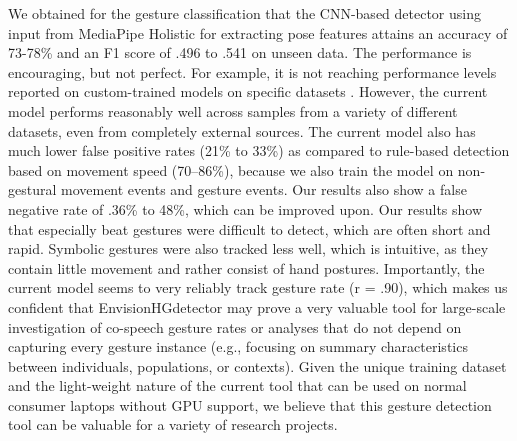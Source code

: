 \documentclass[11pt,smallheadings,cleardoublepage=empty,tocflat,numbers=noenddot,twoside,captions=tableheading]{scrbook}
\begin{document}
\begin{refsection}
We obtained for the gesture classification that the CNN-based detector using input from MediaPipe Holistic for extracting pose features attains an accuracy of 73-78\% and an F1 score of .496 to .541 on unseen data. The performance is encouraging, but not perfect. For example, it is not reaching performance levels reported on custom-trained models on specific datasets \parencite{ienagaSemiautomationGestureAnnotation2022, ghalebCoSpeechGestureDetection2024}. However, the current model performs reasonably well across samples from a variety of different datasets, even from completely external sources. The current model also has much lower false positive rates (21\% to 33\%) as compared to rule-based detection based on movement speed \parencite{pouwSemanticallyRelatedGestures2021, ripperdaSpeedingDetectionNoniconic2020} (70–86\%), because we also train the model on non-gestural movement events and gesture events. Our results also show a false negative rate of .36\% to 48\%, which can be improved upon. Our results show that especially beat gestures were difficult to detect, which are often short and rapid. Symbolic gestures were also tracked less well, which is intuitive, as they contain little movement and rather consist of hand postures. Importantly, the current model seems to very reliably track gesture rate (r = .90), which makes us confident that EnvisionHGdetector may prove a very valuable tool for large-scale investigation of co-speech gesture rates or analyses that do not depend on capturing every gesture instance (e.g., focusing on summary characteristics between individuals, populations, or contexts). Given the unique training dataset and the light-weight nature of the current tool that can be used on normal consumer laptops without GPU support, we believe that this gesture detection tool can be valuable for a variety of research projects. 


\end{refsection}
\end{document}
